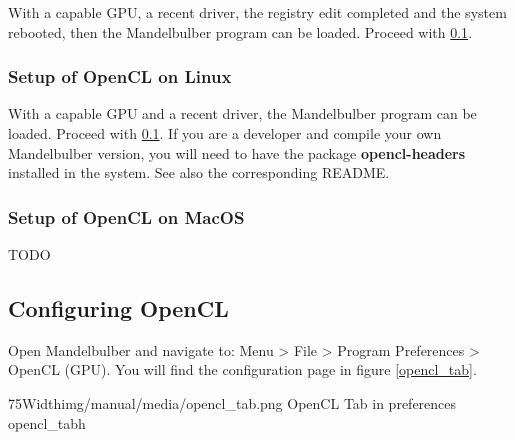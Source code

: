 With a capable GPU, a recent driver, the registry edit completed and the system rebooted, then the Mandelbulber program can be loaded.
Proceed with \ref{configure-opencl}. 

\subsubsection{Setup of OpenCL on Linux}\label{setup-opencl-linux}
With a capable GPU and a recent driver, the Mandelbulber program can be loaded.
Proceed with \ref{configure-opencl}. 
If you are a developer and compile your own Mandelbulber version,
you will need to have the package \textbf{opencl-headers} installed in the system.  
See also the corresponding README.

\subsubsection{Setup of OpenCL on MacOS}\label{setup-opencl-macos}
TODO

\subsection{Configuring OpenCL}\label{configure-opencl}
Open Mandelbulber and navigate to: Menu > File > Program Preferences > OpenCL (GPU).
You will find the configuration page in figure \ref{opencl_tab}.

\simpleImageWithCaption75Width{img/manual/media/opencl_tab.png}
{OpenCL Tab in preferences}
{opencl_tab}{h}

